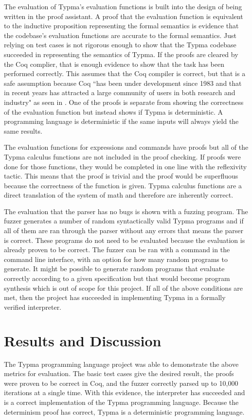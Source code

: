 \documentclass[10pt,twocolumn]{article}
\begin{document}
The evaluation of Typma's evaluation functions is built into the design of being written in the proof assistant. A proof that the evaluation function is equivalent to the inductive proposition representing the formal semantics is evidence that the codebase's evaluation functions are accurate to the formal semantics. Just relying on test cases is not rigorous enough to show that the Typma codebase succeeded in representing the semantics of Typma. If the proofs are cleared by the Coq complier, that is enough evidence to show that the task has been performed correctly. This assumes that the Coq compiler is correct, but that is a safe assumption because Coq ``has been under development since 1983 and that in recent years has attracted a large community of users in both research and industry" as seen in \textcite{Pierce2021Software}. One of the proofs is separate from showing the correctness of the evaluation function but instead shows if Typma is deterministic. A programming language is deterministic if the same inputs will always yield the same results.

The evaluation functions for expressions and commands have proofs but all of the Typma calculus functions are not included in the proof checking. If proofs were done for those functions, they would be completed in one line with the reflexivity tactic. This means that the proof is trivial and the proof would be superfluous because the correctness of the function is given. Typma calculus functions are a direct translation of the system of math and therefore are inherently correct.

The evaluation that the parser has no bugs is shown with a fuzzing program. The fuzzer generates a number of random syntactically valid Typma programs and if all of them are ran through the parser without any errors that means the parser is correct. These programs do not need to be evaluated because the evaluation is already proven to be correct. The fuzzer can be ran with a command in the command line interface, with an option for how many random programs to generate. It might be possible to generate random programs that evaluate correctly according to a given specification but that would become program synthesis which is out of scope for this project. If all of the above conditions are met, then the project has succeeded in implementing Typma in a formally verified interpreter.

\section{Results and Discussion}
The Typma programming language project was able to demonstrate the above metrics for evaluation. The basic test cases give the desired result, the proofs were proven to be correct in Coq, and the fuzzer correctly parsed up to 10,000 iterations at a single time. With this evidence, the interpreter has succeeded and is a correct implementation of the Typma programming language. Because the determinism proof has correct, Typma is a deterministic programming language.
\end{document}
